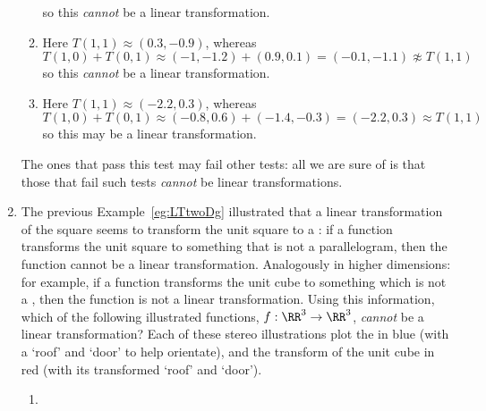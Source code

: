\begin{example}
\begin{enumerate}
\begin{solution}
\begin{enumerate}
so this \emph{cannot} be a linear transformation.
\item Here \(T(1,1)\approx(0.3,-0.9)\), whereas
\(T(1,0)+T(0,1)\approx (-1,-1.2)+(0.9,0.1)
=(-0.1,-1.1)\not\approx T(1,1)\) 
so this \emph{cannot} be a linear transformation.
\item Here \(T(1,1)\approx(-2.2,0.3)\), whereas
\(T(1,0)+T(0,1)\approx (-0.8,0.6)+(-1.4,-0.3)
=(-2.2,0.3)\approx T(1,1)\) 
so this may be a linear transformation.
\end{enumerate} 
The ones that pass this test may fail other tests: all we are sure of is that those that fail such tests \emph{cannot} be linear transformations.
\end{solution}

\item\label{eg:LTthreeDg}
The previous Example~\ref{eg:LTtwoDg} illustrated that a linear transformation of the square seems to transform the unit square to a : if a function transforms the unit square to something that is not a parallelogram, then the function cannot be a linear transformation.
Analogously in higher dimensions: for example, if a function transforms the unit cube to something which is not a , then the function is not a linear transformation.
Using this information, which of the following illustrated functions, \(f:\RR^3\to\RR^3\), \emph{cannot} be a linear transformation?
Each of these stereo illustrations plot the  in blue (with a `roof' and `door' to help orientate), and the transform of the unit cube in red (with its transformed `roof' and `door').
\begin{enumerate}
\item \def\unithousesize{small}
\end{enumerate}
\end{enumerate}
\end{example}
